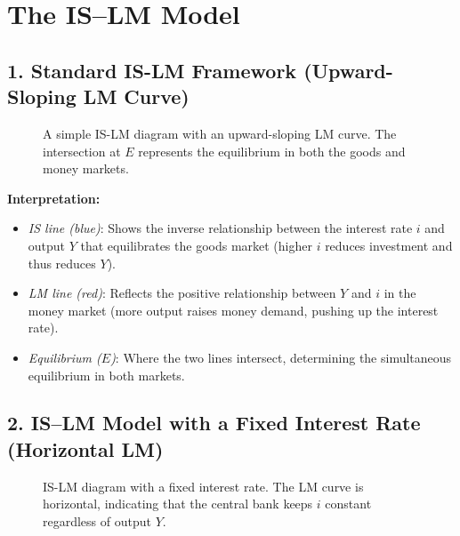 \chapter*{The IS--LM Model}
\section*{1. Standard IS-LM Framework (Upward-Sloping LM Curve)}
\begin{figure}[h!]
    \centering
    \caption{A simple IS-LM diagram with an upward-sloping LM curve. 
    The intersection at $E$ represents the equilibrium in both the goods and money markets.}
\end{figure}

\noindent
\textbf{Interpretation:} 
\begin{itemize}
    \item \emph{IS line (blue)}: Shows the inverse relationship between the interest rate $i$ and output $Y$ that equilibrates the goods market (higher $i$ reduces investment and thus reduces $Y$).
    \item \emph{LM line (red)}: Reflects the positive relationship between $Y$ and $i$ in the money market (more output raises money demand, pushing up the interest rate).
    \item \emph{Equilibrium ($E$)}: Where the two lines intersect, determining the simultaneous equilibrium in both markets.
\end{itemize}

\section*{2. IS--LM Model with a Fixed Interest Rate (Horizontal LM)}
\begin{figure}[h!]
    \centering
    \caption{IS-LM diagram with a fixed interest rate. The LM curve is horizontal, 
    indicating that the central bank keeps $i$ constant regardless of output $Y$.}
\end{figure}

